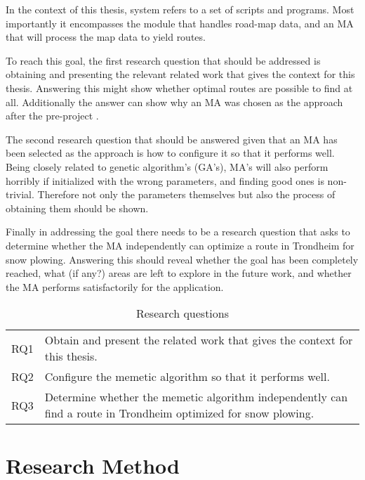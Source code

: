 In the context of this thesis, system refers to a set of scripts and programs. Most importantly it encompasses the module that handles road-map data, and an MA that will process the map data to yield routes.

To reach this goal, the first research question that should be addressed is obtaining and presenting the relevant related work that gives the context for this thesis. Answering this might show whether optimal routes are possible to find at all. Additionally the answer can show why an MA was chosen as the approach after the pre-project \citep{forprosjektet}.

The second research question that should be answered given that an MA has been selected as the approach is how to configure it so that it performs well. Being closely related to genetic algorithm's (GA's), MA's will also perform horribly if initialized with the wrong parameters, and finding good ones is non-trivial. Therefore not only the parameters themselves but also the process of obtaining them should be shown.

Finally in addressing the goal there needs to be a research question that asks to determine whether the MA independently can optimize a route in Trondheim for snow plowing. Answering this should reveal whether the goal has been completely reached, what (if any?) areas are left to explore in the future work, and whether the MA performs satisfactorily for the application.

\begin{table}[H]
\centering
\begin{tabular}{cp{}}
RQ1  &  Obtain and present the related work that gives the context for this thesis. \\
RQ2  &  Configure the memetic algorithm so that it performs well.\\
RQ3  &  Determine whether the memetic algorithm independently can find a route in Trondheim optimized for snow plowing. \\
\end{tabular}
\caption{Research questions}
\label{tab:research_questions}
\end{table}

\section{Research Method}

